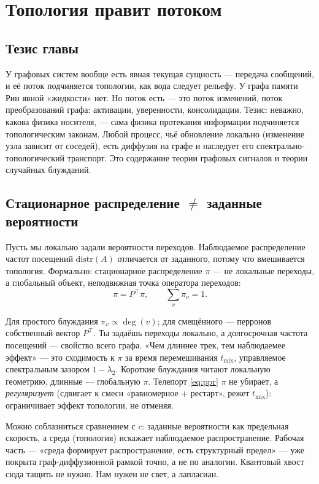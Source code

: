 \chapter{Топология правит потоком}
\label{ch:topology}

\section{Тезис главы}

У графовых систем вообще есть явная текущая сущность --- передача сообщений, и
её поток подчиняется топологии, как вода следует рельефу. У графа памяти Рин
явной «жидкости» нет. Но поток есть --- это поток изменений, поток
преобразований графа: активации, уверенности, консолидации. Тезис: неважно,
какова физика носителя, --- сама физика протекания информации подчиняется
топологическим законам. Любой процесс, чьё обновление локально (изменение узла
зависит от соседей), есть диффузия на графе и наследует его
спектрально-топологический транспорт. Это содержание теории графовых сигналов и
теории случайных блужданий.

\section{Стационарное распределение $\neq$ заданные вероятности}

Пусть мы локально задали вероятности переходов. Наблюдаемое распределение
частот посещений $\mathrm{distr}(A)$ отличается от заданного, потому что
вмешивается топология. Формально: стационарное распределение $\pi$ --- не
локальные переходы, а глобальный объект, неподвижная точка оператора переходов:
\begin{equation}
\pi = P^{\top}\pi, \qquad \sum_v \pi_v = 1.
\end{equation}

Для простого блуждания $\pi_v \propto \deg(v)$; для смещённого --- перронов
собственный вектор $P^{\top}$. Ты задаёшь переходы локально, а долгосрочная
частота посещений --- свойство всего графа. «Чем длиннее трек, тем наблюдаемее
эффект» --- это сходимость к $\pi$ за время перемешивания $t_{\mathrm{mix}}$,
управляемое спектральным зазором $1 - \lambda_2$. Короткие блуждания читают
локальную геометрию, длинные --- глобальную $\pi$. Телепорт \eqref{eq:ppr}
$\pi$ не убирает, а \emph{регуляризует} (сдвигает к смеси «равномерное +
рестарт», режет $t_{\mathrm{mix}}$): ограничивает эффект топологии, не отменяя.

\begin{openq}
Можно соблазниться сравнением с $c$: заданные вероятности как предельная
скорость, а среда (топология) искажает наблюдаемое распространение. Рабочая
часть --- «среда формирует распространение, есть структурный предел» --- уже
покрыта граф-диффузионной рамкой точно, а не по аналогии. Квантовый хвост
сюда тащить не нужно. Нам нужен не свет, а лапласиан.
\end{openq}

